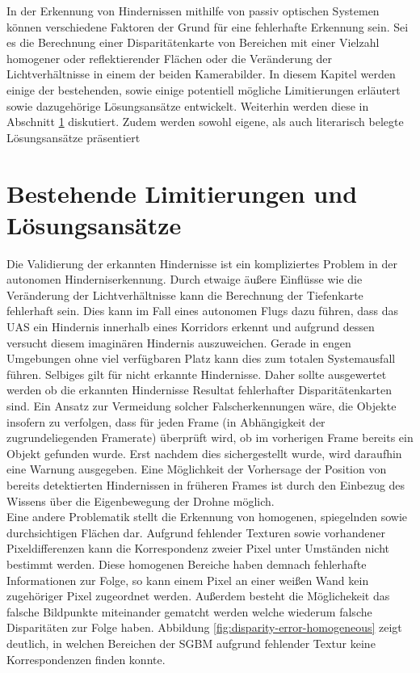 In der Erkennung von Hindernissen mithilfe von passiv optischen Systemen können verschiedene Faktoren der Grund für eine fehlerhafte Erkennung sein. Sei es die Berechnung einer Disparitätenkarte von Bereichen mit einer Vielzahl homogener oder reflektierender Flächen oder die Veränderung der Lichtverhältnisse in einem der beiden Kamerabilder. In diesem Kapitel werden einige der bestehenden, sowie einige potentiell mögliche Limitierungen erläutert sowie dazugehörige Lösungsansätze entwickelt. Weiterhin werden diese in Abschnitt \ref{sec:existing_conflicts} diskutiert. Zudem werden sowohl eigene, als auch literarisch belegte Lösungsansätze präsentiert\\

\section{Bestehende Limitierungen und Lösungsansätze}
\label{sec:existing_conflicts}

Die Validierung der erkannten Hindernisse ist ein kompliziertes Problem in der autonomen Hinderniserkennung. Durch etwaige äußere Einflüsse wie die Veränderung der Lichtverhältnisse kann die Berechnung der Tiefenkarte fehlerhaft sein. Dies kann im Fall eines autonomen Flugs dazu führen, dass das UAS ein Hindernis innerhalb eines Korridors erkennt und aufgrund dessen versucht diesem imaginären Hindernis auszuweichen. Gerade in engen Umgebungen ohne viel verfügbaren Platz kann dies zum totalen Systemausfall führen. Selbiges gilt für nicht erkannte Hindernisse. Daher sollte ausgewertet werden ob die erkannten Hindernisse Resultat fehlerhafter Disparitätenkarten sind. Ein Ansatz zur Vermeidung solcher Falscherkennungen wäre, die Objekte insofern zu verfolgen, dass für jeden Frame (in Abhängigkeit der zugrundeliegenden Framerate) überprüft wird, ob im vorherigen Frame bereits ein Objekt gefunden wurde. Erst nachdem dies sichergestellt wurde, wird daraufhin eine Warnung ausgegeben. Eine Möglichkeit der Vorhersage der Position von bereits detektierten Hindernissen in früheren Frames ist durch den Einbezug des Wissens über die Eigenbewegung der Drohne möglich.\\

\noindent
Eine andere Problematik stellt die Erkennung von homogenen, spiegelnden sowie durchsichtigen Flächen dar. Aufgrund fehlender Texturen sowie vorhandener Pixeldifferenzen kann die Korrespondenz zweier Pixel unter Umständen nicht bestimmt werden. Diese homogenen Bereiche haben demnach fehlerhafte Informationen zur Folge, so kann einem Pixel an einer weißen Wand kein zugehöriger Pixel zugeordnet werden. Außerdem besteht die Möglichekeit das falsche Bildpunkte miteinander gematcht werden welche wiederum falsche Disparitäten zur Folge haben. Abbildung \ref{fig:disparity-error-homogeneous} zeigt deutlich, in welchen Bereichen der SGBM aufgrund fehlender Textur keine Korrespondenzen finden konnte.\\

